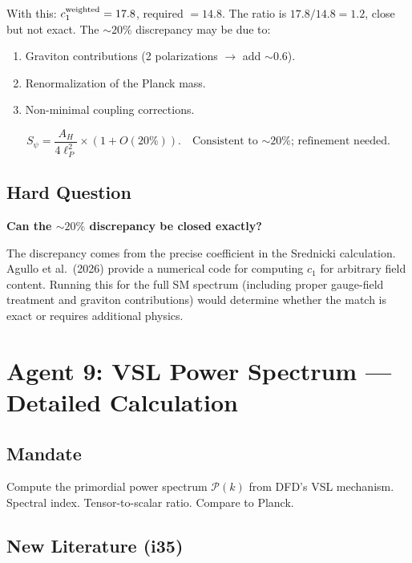 \documentclass[11pt,a4paper]{article}
\begin{document}
With this: $c_1^{\rm weighted} = 17.8$, required $= 14.8$. The ratio is $17.8/14.8 = 1.2$, close but not exact. The $\sim 20\%$ discrepancy may be due to:
\begin{enumerate}
\item Graviton contributions (2 polarizations $\to$ add $\sim 0.6$).
\item Renormalization of the Planck mass.
\item Non-minimal coupling corrections.
\end{enumerate}

\begin{equation}
\boxed{S_\psi = \frac{A_H}{4\ell_P^2} \times (1 + O(20\%)).\quad\text{Consistent to $\sim 20\%$; refinement needed.}}
\end{equation}

\subsection{Hard Question}

\textbf{Can the $\sim 20\%$ discrepancy be closed exactly?}

The discrepancy comes from the precise coefficient in the Srednicki calculation. Agullo et al.\ (2026) provide a numerical code for computing $c_1$ for arbitrary field content. Running this for the full SM spectrum (including proper gauge-field treatment and graviton contributions) would determine whether the match is exact or requires additional physics.

\newpage
\section{Agent 9: VSL Power Spectrum --- Detailed Calculation}
\label{sec:agent9}

\subsection{Mandate}

Compute the primordial power spectrum $\mathcal{P}(k)$ from DFD's VSL mechanism. Spectral index. Tensor-to-scalar ratio. Compare to Planck.

\subsection{New Literature (i35)}
\end{document}
